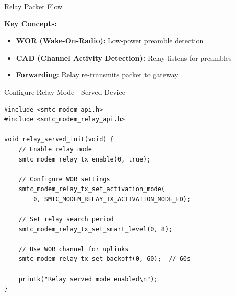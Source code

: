 \documentclass{beamer}
\begin{document}
\begin{frame}{Relay Packet Flow}
\begin{center}
\end{center}

\vspace{0.3cm}

\textbf{Key Concepts:}
\begin{itemize}
    \item \textbf{WOR (Wake-On-Radio):} Low-power preamble detection
    \item \textbf{CAD (Channel Activity Detection):} Relay listens for preambles
    \item \textbf{Forwarding:} Relay re-transmits packet to gateway
\end{itemize}
\end{frame}

\begin{frame}[fragile]{Configure Relay Mode - Served Device}
\begin{lstlisting}[caption={Enable Relay for Served Device}]
#include <smtc_modem_api.h>
#include <smtc_modem_relay_api.h>

void relay_served_init(void) {
    // Enable relay mode
    smtc_modem_relay_tx_enable(0, true);

    // Configure WOR settings
    smtc_modem_relay_tx_set_activation_mode(
        0, SMTC_MODEM_RELAY_TX_ACTIVATION_MODE_ED);

    // Set relay search period
    smtc_modem_relay_tx_set_smart_level(0, 8);

    // Use WOR channel for uplinks
    smtc_modem_relay_tx_set_backoff(0, 60);  // 60s

    printk("Relay served mode enabled\n");
}
\end{lstlisting}
\end{frame}
\end{document}
